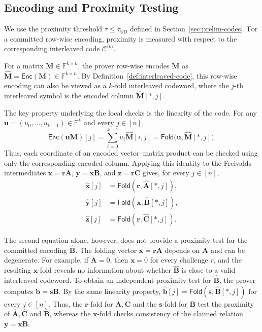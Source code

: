 \documentclass[conference,compsoc]{IEEEtran}
\newif\ifshowrevisions
\newenvironment{revblock}[1][]
  {%
    \ifshowrevisions
      \begin{tcolorbox}[
        breakable,
        colback=revisionyellow,
        colframe=revisionyellow,
        boxrule=0pt,
        arc=0pt,
        left=2pt,
        right=2pt,
        top=2pt,
        bottom=2pt,
        before skip=2pt,
        after skip=2pt,
        #1
      ]
    \fi
  }
  {%
    \ifshowrevisions
      \end{tcolorbox}
    \fi
  }
\newcommand{\mat}{\mathbf}          %
\newcommand{\vect}{\mathbf}         %
\renewcommand{\enc}{\mathsf{Enc}}   %
\newcommand{\ud}{{\mathsf{UD}}}
\newcommand{\fold}{\textsf{Fold}}
\theoremstyle{plain}
\theoremstyle{definition}
\theoremstyle{remark}
\begin{document}
\subsection{Encoding and Proximity Testing}
\label{sec:overview-encoding}
\begin{revblock}
We use the proximity threshold $\tau \leq \tau_{\ud}$ defined in
Section~\ref{sec:prelim-codes}. For a committed row-wise encoding, proximity
is measured with respect to the corresponding interleaved code
$\mathcal{C}^{\langle k\rangle}$.
\end{revblock}

For a matrix $\mat{M}\in\mathbb{F}^{k\times k}$, the prover row-wise encodes
$\mat{M}$ as
$\widehat{\mat{M}}=\enc(\mat{M})\in\mathbb{F}^{k\times n}$.
By Definition~\ref{def:interleaved-code}, this row-wise encoding can also be
viewed as a $k$-fold interleaved codeword, where the $j$-th interleaved
symbol is the encoded column $\widehat{\mat{M}}[*,j]$.

\begin{revblock}
The key property underlying the local checks is the linearity of the code.
For any $\vect{u}=(u_0,\ldots,u_{k-1})\in\mathbb{F}^k$ and every $j \in [n]$,
\[
  \enc(\vect{u}\mat{M})[j] = \sum_{i=0}^{k-1} u_i\widehat{\mat{M}}[i,j] = \fold\bigl( \vect{u}, \widehat{\mat{M}}[*,j] \bigr).
\]
Thus, each coordinate of an encoded vector--matrix product can be checked
using only the corresponding encoded column.
Applying this identity to the Freivalds intermediates
\(\vect{x}=\vect{r}\mat{A}\),
\(\vect{y}=\vect{x}\mat{B}\), and
\(\vect{z}=\vect{r}\mat{C}\)
gives, for every \(j\in[n]\),
\[
\begin{aligned}
\widehat{\vect{x}}[j]
  &= \fold(\vect{r},\widehat{\mat{A}}[*,j]),\\
\widehat{\vect{y}}[j]
  &= \fold(\vect{x},\widehat{\mat{B}}[*,j]),\\
\widehat{\vect{z}}[j]
  &= \fold(\vect{r},\widehat{\mat{C}}[*,j]).
\end{aligned}
\]
\end{revblock}

\begin{revblock}
  The second equation alone, however, does not provide a proximity test for the
committed encoding $\widehat{\mat{B}}$. The folding vector $\vect{x}=\vect{r}\mat{A}$ depends on $\mat{A}$ and can be degenerate.
For example, if \(\mat{A}=0\), then \(\vect{x}=0\) for every challenge \(r\), and the resulting $\vect{x}$-fold reveals no information about whether $\widehat{\mat{B}}$ is close to a valid interleaved codeword.
To obtain an independent proximity test for $\widehat{\mat{B}}$, the
prover computes $\vect{b}=\vect{s}\mat{B}.$
By the same linearity property, $\widehat{\vect{b}}[j] = \fold(\vect{s}, \widehat{\mat{B}}[*, j])$ for every $j \in [n]$.
Thus, the $\vect{r}$-fold for $\mat{A}, \mat{C}$ and the $\vect{s}$-fold for $\mat{B}$ test the proximity of $\widehat{\mat{A}}, \widehat{\mat{C}}$ and $\widehat{\mat{B}}$, whereas the $\vect{x}$-fold checks consistency of the claimed relation $\vect{y} = \vect{x}\mat{B}$.
\end{revblock}
\end{document}
